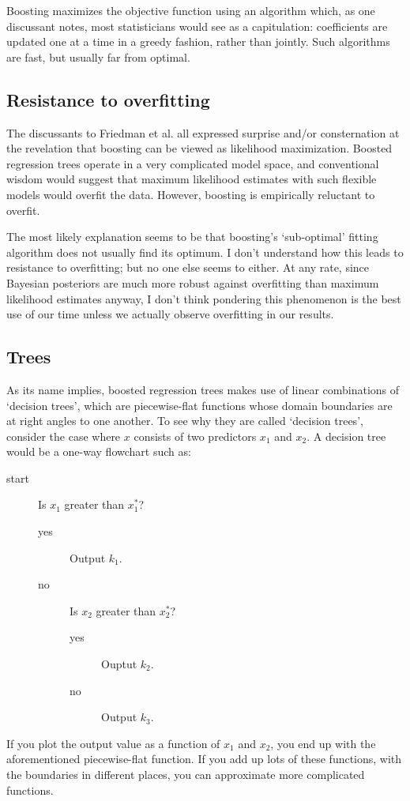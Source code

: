 Boosting maximizes the objective function using an algorithm which, as one discussant notes, most statisticians would see as a capitulation: coefficients are updated one at a time in a greedy fashion, rather than jointly. Such algorithms are fast, but usually far from optimal.
 
\subsection{Resistance to overfitting}
\label{sec:res-to-overfitting} 
The discussants to Friedman et al. all expressed surprise and/or consternation at the revelation that boosting can be viewed as likelihood maximization. Boosted regression trees operate in a very complicated model space, and conventional wisdom would suggest that maximum likelihood estimates with such flexible models would overfit the data. However, boosting is empirically reluctant to overfit.

The most likely explanation seems to be that boosting's `sub-optimal' fitting algorithm does not usually find its optimum. I don't understand how this leads to resistance to overfitting; but no one else seems to either. At any rate, since Bayesian posteriors are much more robust against overfitting than maximum likelihood estimates anyway, I don't think pondering this phenomenon is the best use of our time unless we actually observe overfitting in our results.

\subsection{Trees} 
\label{sec:trees} 
As its name implies, boosted regression trees makes use of linear combinations of `decision trees', which are piecewise-flat functions whose domain boundaries are at right angles to one another. To see why they are called `decision trees', consider the case where $x$ consists of two predictors $x_1$ and $x_2$. A decision tree would be a one-way flowchart such as:
\begin{description}
    \item[start] Is $x_1$ greater than $x_1^*$?
    \begin{description}
        \item[yes] Output $k_1$. 
        \item[no] Is $x_2$ greater than $x_2^*$?
        \begin{description}
            \item[yes] Ouptut $k_2$.
            \item[no] Output $k_3$.
        \end{description}
    \end{description}
\end{description}
If you plot the output value as a function of $x_1$ and $x_2$, you end up with the aforementioned piecewise-flat function. If you add up lots of these functions, with the boundaries in different places, you can approximate more complicated functions.

